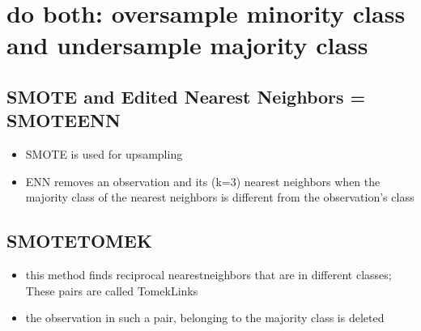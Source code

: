 \documentclass[letterpaper,10pt,english]{jupyterBook}
\begin{document}
\section{do both: oversample minority class and undersample majority class}
\label{\detokenize{imbalanced_data:do-both-oversample-minority-class-and-undersample-majority-class}}

\subsection{SMOTE and Edited Nearest Neighbors = SMOTE\sphinxhyphen{}ENN}
\label{\detokenize{imbalanced_data:smote-and-edited-nearest-neighbors-smote-enn}}\begin{itemize}
\item {} 
\sphinxAtStartPar
SMOTE is used for upsampling

\item {} 
\sphinxAtStartPar
ENN removes an observation and its (k=3) nearest neighbors when the majority class of the nearest neighbors is different from the observation’s class

\end{itemize}


\subsection{SMOTETOMEK}
\label{\detokenize{imbalanced_data:smotetomek}}\begin{itemize}
\item {} 
\sphinxAtStartPar
this method finds reciprocal nearest\sphinxhyphen{}neighbors that are in different classes; These pairs are called Tomek\sphinxhyphen{}Links

\item {} 
\sphinxAtStartPar
the observation in such a pair, belonging to the majority class is deleted

\end{itemize}

\begin{sphinxVerbatim}[commandchars=\\\{\}]
   
    
\end{sphinxVerbatim}
\end{document}
